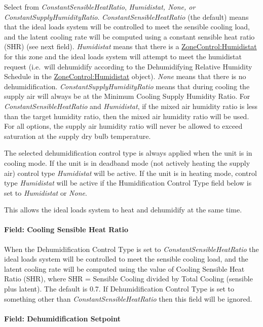 Select from \emph{ConstantSensibleHeatRatio}, \emph{Humidistat, None, or ConstantSupplyHumidityRatio}. \emph{ConstantSensibleHeatRatio} (the default) means that the ideal loads system will be controlled to meet the sensible cooling load, and the latent cooling rate will be computed using a constant sensible heat ratio (SHR) (see next field). \emph{Humidistat} means that there is a \hyperref[zonecontrolhumidistat]{ZoneControl:Humidistat} for this zone and the ideal loads system will attempt to meet the humidistat request (i.e.~will dehumidify according to the Dehumidifying Relative Humidity Schedule in the \hyperref[zonecontrolhumidistat]{ZoneControl:Humidistat} object). \emph{None} means that there is no dehumidification. \emph{ConstantSupplyHumidityRatio} means that during cooling the supply air will always be at the Minimum Cooling Supply Humidity Ratio. For \emph{ConstantSensibleHeatRatio} and \emph{Humidistat}, if the mixed air humidity ratio is less than the target humidity ratio, then the mixed air humidity ratio will be used. For all options, the supply air humidity ratio will never be allowed to exceed saturation at the supply dry bulb temperature.

The selected dehumidification control type is always applied when the unit is in cooling mode. If the unit is in deadband mode (not actively heating the supply air) control type \emph{Humidistat} will be active. If the unit is in heating mode, control type \emph{Humidistat} will be active if the Humidification Control Type field below is set to \emph{Humidistat} or \emph{None}.

This allows the ideal loads system to heat and dehumidify at the same time.

\paragraph{Field: Cooling Sensible Heat Ratio}\label{field-cooling-sensible-heat-ratio}

When the Dehumidification Control Type is set to \emph{ConstantSensibleHeatRatio} the ideal loads system will be controlled to meet the sensible cooling load, and the latent cooling rate will be computed using the value of Cooling Sensible Heat Ratio (SHR), where SHR = Sensible Cooling divided by Total Cooling (sensible plus latent). The default is 0.7. If Dehumidification Control Type is set to something other than \emph{ConstantSensibleHeatRatio} then this field will be ignored.

\paragraph{Field: Dehumidification Setpoint}\label{field-dehumidification-setpoint}


